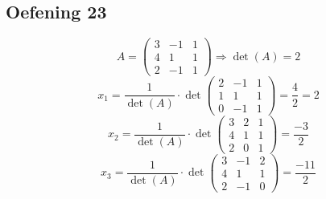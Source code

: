 \documentclass[lineaire_algebra_oplossingen.tex]{subfiles}
\begin{document}
\subsection{Oefening 23}
\[ A = 
\begin{pmatrix}
3 & -1 & 1\\
4 & 1 & 1\\
2 & -1 & 1
\end{pmatrix}
\Longrightarrow\det(A) = 2
\]
\[x_1 = \frac{1}{\det(A)} \cdot \det 
\begin{pmatrix}
2 & -1 & 1\\
1 & 1 & 1\\
0 & -1 & 1
\end{pmatrix}
= \frac{4}{2} = 2 \]
\[x_2 = \frac{1}{\det(A)} \cdot \det
\begin{pmatrix}
3 & 2 & 1\\
4 & 1 & 1\\
2 & 0 & 1
\end{pmatrix}
= \frac{-3}{2} \]
\[x_3 = \frac{1}{\det(A)} \cdot \det
\begin{pmatrix}
3 & -1 & 2\\
4 & 1 & 1\\
2 & -1 & 0
\end{pmatrix}
= \frac{-11}{2} \]
\end{document}
